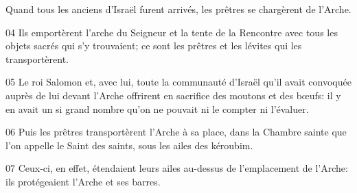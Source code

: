 Quand tous les anciens d’Israël furent arrivés, les prêtres se chargèrent de l’Arche.

04 Ils emportèrent l’arche du Seigneur et la tente de la Rencontre avec tous les objets sacrés qui s’y trouvaient; ce sont les prêtres et les lévites qui les transportèrent.

05 Le roi Salomon et, avec lui, toute la communauté d’Israël qu’il avait convoquée auprès de lui devant l’Arche offrirent en sacrifice des moutons et des bœufs: il y en avait un si grand nombre qu’on ne pouvait ni le compter ni l’évaluer.

06 Puis les prêtres transportèrent l’Arche à sa place, dans la Chambre sainte que l’on appelle le Saint des saints, sous les ailes des kéroubim.

07 Ceux-ci, en effet, étendaient leurs ailes au-dessus de l’emplacement de l’Arche: ils protégeaient l’Arche et ses barres.